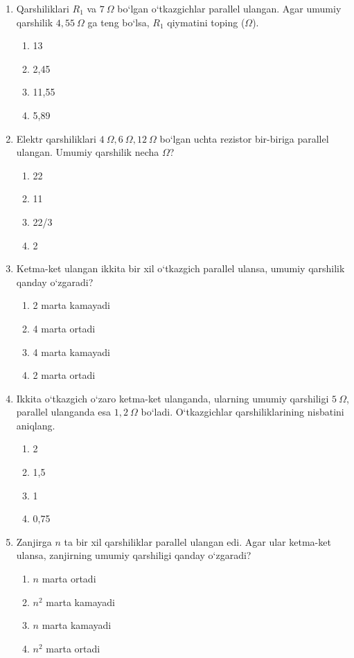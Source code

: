 \begin{enumerate}
\item Qarshiliklari $R_1$ va $7~\Omega$ bo‘lgan o‘tkazgichlar parallel ulangan. Agar umumiy qarshilik $4,55~\Omega$ ga teng bo‘lsa, $R_1$ qiymatini toping ($\Omega$). 
\begin{enumerate}[label=\Alph*)]
\item 13
\item 2,45
\item 11,55
\item 5,89
\end{enumerate}

\item Elektr qarshiliklari $4~\Omega, 6~\Omega, 12~\Omega$ bo‘lgan uchta rezistor bir-biriga parallel ulangan. Umumiy qarshilik necha $\Omega$? 
\begin{enumerate}[label=\Alph*)]
\item 22
\item 11
\item 22/3
\item 2
\end{enumerate}

\item Ketma-ket ulangan ikkita bir xil o‘tkazgich parallel ulansa, umumiy qarshilik qanday o‘zgaradi? 
\begin{enumerate}[label=\Alph*)]
\item 2 marta kamayadi
\item 4 marta ortadi
\item 4 marta kamayadi
\item 2 marta ortadi
\end{enumerate}

\item Ikkita o‘tkazgich o‘zaro ketma-ket ulanganda, ularning umumiy qarshiligi $5~\Omega$, parallel ulanganda esa $1,2~\Omega$ bo‘ladi. O‘tkazgichlar qarshiliklarining nisbatini aniqlang.
\begin{enumerate}[label=\Alph*)]
\item 2
\item 1,5
\item 1
\item 0,75
\end{enumerate}

\item Zanjirga $n$ ta bir xil qarshiliklar parallel ulangan edi. Agar ular ketma-ket ulansa, zanjirning umumiy qarshiligi qanday o‘zgaradi? 
\begin{enumerate}[label=\Alph*)]
\item $n$ marta ortadi
\item $n^2$ marta kamayadi
\item $n$ marta kamayadi
\item $n^2$ marta ortadi
\end{enumerate}


\end{enumerate}
